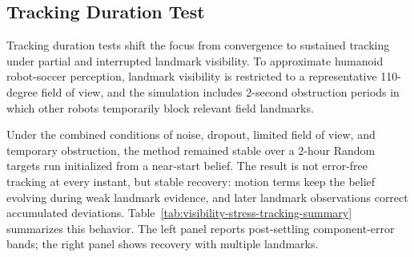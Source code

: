 \subsection{Tracking Duration Test}
\label{subsec:experiments-visibility-stress}

Tracking duration tests shift the focus from convergence to sustained tracking under partial and interrupted landmark visibility. To approximate humanoid robot-soccer perception, landmark visibility is restricted to a representative 110-degree field of view, and the simulation includes 2-second obstruction periods in which other robots temporarily block relevant field landmarks.

Under the combined conditions of noise, dropout, limited field of view, and temporary obstruction, the method remained stable over a 2-hour Random targets run initialized from a near-start belief. The result is not error-free tracking at every instant, but stable recovery: motion terms keep the belief evolving during weak landmark evidence, and later landmark observations correct accumulated deviations. Table~\ref{tab:visibility-stress-tracking-summary} summarizes this behavior. The left panel reports post-settling component-error bands; the right panel shows recovery with multiple landmarks.

